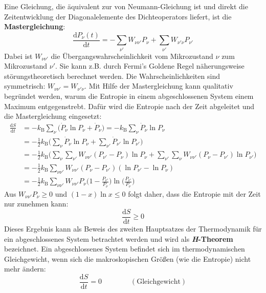 \documentclass[9pt]{report}
\begin{document}
Eine Gleichung, die äquivalent zur von Neumann-Gleichung ist und direkt die Zeitentwicklung der Diagonalelemente des Dichteoperators liefert, ist die \textbf{Mastergleichung}:
\begin{equation}
\frac{\mathrm{d}P_{\nu}(t)}{\mathrm{d}t}=-\sum_{\nu'}W_{\nu\nu'}P_{\nu}+\sum_{\nu'}W_{\nu'\nu}P_{\nu'}\label{Master equation}
\end{equation}
Dabei ist $W_{\nu\nu'}$ die Übergangswahrscheinlichkeit vom Mikrozustand $\nu$ zum Mikrozustand $\nu'$. Sie kann z.B. durch Fermi's Goldene Regel näherungsweise störungstheoretisch berechnet werden. Die Wahrscheinlichkeiten sind symmetrisch: $W_{\nu\nu'}=W_{\nu'\nu}$. Mit Hilfe der Mastergleichung kann qualitativ begründet werden, warum die Entropie in einem abgeschlossenen System einem Maximum entgegenstrebt. Dafür wird die Entropie nach der Zeit abgeleitet und die Mastergleichung eingesetzt:
\begin{align}
\frac{\mathrm{d}S}{\mathrm{d}t} &= -k_{\mathrm{B}}\sum_{\nu}\big(\dot{P}_{\nu}\ln P_{\nu}+\dot{P}_{\nu}\big) = -k_{\mathrm{B}}\sum_{\nu}\dot{P}_{\nu}\ln P_{\nu}\label{Entropy derivation}\\
&= -\frac{1}{2}k_{\mathrm{B}}\Big(\sum_{\nu}\dot{P}_{\nu}\ln P_{\nu}+\sum_{\nu'}\dot{P}_{\nu'}\ln P_{\nu'}\Big)\\
&= -\frac{1}{2}k_{\mathrm{B}}\Big(\sum_{\nu}\sum_{\nu'}W_{\nu\nu'}(P_{\nu'}-P_{\nu})\ln P_{\nu}+\sum_{\nu'}\sum_{\nu}W_{\nu\nu'}(P_{\nu}-P_{\nu'})\ln P_{\nu'}\Big)\\
&= -\frac{1}{2}k_{\mathrm{B}}\sum_{\nu\nu'}W_{\nu\nu'}(P_{\nu}-P_{\nu'})(\ln P_{\nu'}-\ln P_{\nu})\\
&= -\frac{1}{2}k_{\mathrm{B}}\sum_{\nu\nu'}W_{\nu\nu'}P_{\nu}\Big(1-\frac{P_{\nu'}}{P_{\nu}}\Big)\ln\Big(\frac{P_{\nu'}}{P_{\nu}}\Big)
\end{align}
Aus $W_{\nu\nu'}P_{\nu}\geq 0$ und $(1-x)\ln x\leq 0$ folgt daher, dass die Entropie mit der Zeit nur zunehmen kann:
\begin{equation}
\frac{\mathrm{d}S}{\mathrm{d}t}\geq 0
\end{equation}
Dieses Ergebnis kann als Beweis des zweiten Hauptsatzes der Thermodynamik für ein abgeschlossenes System betrachtet werden und wird als \textbf{\textit{H}-Theorem} bezeichnet. Ein abgeschlossenes System befindet sich im thermodynamischen Gleichgewicht, wenn sich die makroskopischen Größen (wie die Entropie) nicht mehr ändern:
\begin{equation}
\frac{\mathrm{d}S}{\mathrm{d}t}=0\qquad\qquad\boldsymbol{\mathrm{(Gleichgewicht)}}\label{Entropy in equillibrium}
\end{equation}
\end{document}
